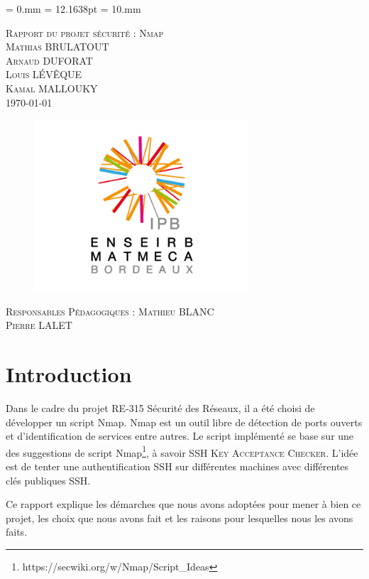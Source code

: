 \documentclass[frenchb]{article}
\begin{document}
\topmargin        = 0.mm
\headheight       = 12.1638pt
\evensidemargin   = 10.mm
\begin{titlepage}
  \begin{center}
    \textsc{\LARGE Rapport du projet sécurité : Nmap}\\[0.5cm]
    \textsc{\Large Mathias BRULATOUT\\ Arnaud DUFORAT\\ Louis L\'EV\^EQUE\\ Kamal MALLOUKY}\\[1.5cm]
    \textsc{\Large \today }\\[1.5cm]
    \begin{figure}[h!]
      \center
      \includegraphics[width=8cm]{enseirb.png}
    \end{figure}
    \vspace{1cm}
    \textsc{\Large Responsables Pédagogiques : Mathieu BLANC \\ \hspace{7cm} Pierre LALET}
  \end{center}  
\end{titlepage}
\section*{Introduction}
Dans le cadre du projet RE-315 Sécurité des Réseaux, il a été choisi de développer un script Nmap. Nmap est un outil libre de détection de ports ouverts et d'identification de services entre autres. Le script implémenté se base sur une des suggestions de script Nmap\footnote{https://secwiki.org/w/Nmap/Script\_Ideas}, à savoir \textsc{SSH Key Acceptance Checker}. L'idée est de tenter une authentification SSH sur différentes machines avec différentes clés publiques SSH.

Ce rapport explique les démarches que nous avons adoptées pour mener à bien ce projet, les choix que nous avons fait et les raisons pour lesquelles nous les avons faits.
\end{document}
